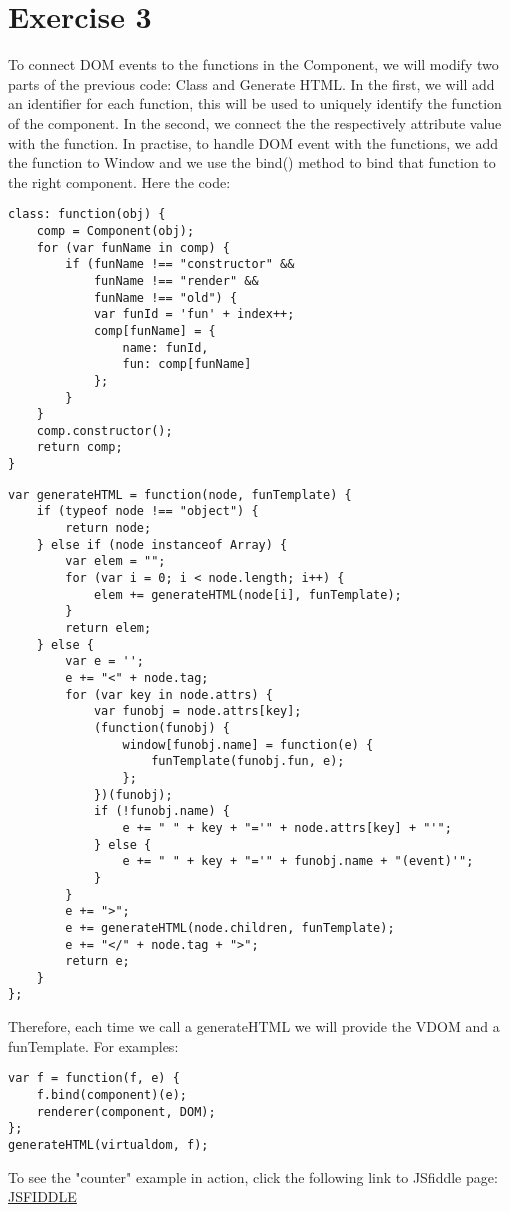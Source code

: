 \documentclass[10pt]{article}
\begin{document}
\section*{Exercise 3}
To connect DOM events to the functions in the Component, we will modify two parts of the previous code: Class and Generate HTML. In the first, we will add an identifier for each function, this will be used to uniquely identify the function of the component. In the second, we connect the the respectively attribute value with the function. In practise, to handle DOM event with the functions, we add the function to Window and we use the bind() method to bind that function to the right component. Here the code: 
\begin{lstlisting}[caption=New class]
class: function(obj) {
    comp = Component(obj);
    for (var funName in comp) {
        if (funName !== "constructor" &&
            funName !== "render" &&
            funName !== "old") {
            var funId = 'fun' + index++;
            comp[funName] = {
                name: funId,
                fun: comp[funName]
            };
        }
    }
    comp.constructor();
    return comp;
}
\end{lstlisting}  
\begin{lstlisting}[caption=New generateHTML]
var generateHTML = function(node, funTemplate) {
    if (typeof node !== "object") {
        return node;
    } else if (node instanceof Array) {
        var elem = "";
        for (var i = 0; i < node.length; i++) {
            elem += generateHTML(node[i], funTemplate);
        }
        return elem;
    } else {
        var e = '';
        e += "<" + node.tag;
        for (var key in node.attrs) {
            var funobj = node.attrs[key];
            (function(funobj) {
                window[funobj.name] = function(e) {
                    funTemplate(funobj.fun, e);
                };
            })(funobj);
            if (!funobj.name) {
                e += " " + key + "='" + node.attrs[key] + "'";
            } else {
                e += " " + key + "='" + funobj.name + "(event)'";
            }
        }
        e += ">";
        e += generateHTML(node.children, funTemplate);
        e += "</" + node.tag + ">";
        return e;
    }
};
\end{lstlisting}   
Therefore, each time we call a generateHTML we will provide the VDOM and a funTemplate. For examples:
\begin{lstlisting}[caption=Example]
var f = function(f, e) {
    f.bind(component)(e);
    renderer(component, DOM);
};
generateHTML(virtualdom, f);
\end{lstlisting}   
To see the "counter" example in action, click the following link to JSfiddle page: \href{https://jsfiddle.net/moh2y4rk/}{JSFIDDLE}
\end{document}
